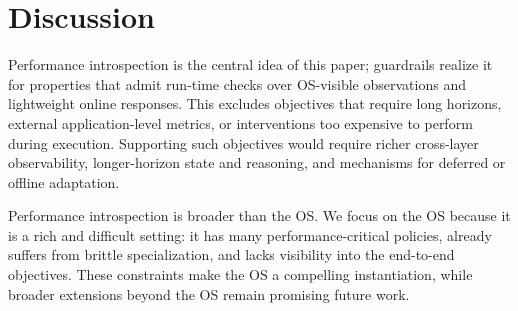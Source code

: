 \section{Discussion}\label{sec:discussion}


Performance introspection is the central idea of this paper; guardrails realize it for properties that admit run-time checks over OS-visible observations and lightweight online responses. This excludes objectives that require long horizons, external application-level metrics, or interventions too expensive to perform during execution. Supporting such objectives would require richer cross-layer observability, longer-horizon state and reasoning, and mechanisms for deferred or offline adaptation.

Performance introspection is broader than the OS. We focus on the OS because it is a rich and difficult setting: it has many performance-critical policies, already suffers from brittle specialization, and lacks visibility into the end-to-end objectives. These constraints make the OS a compelling instantiation, while broader extensions beyond the OS remain promising future work.
